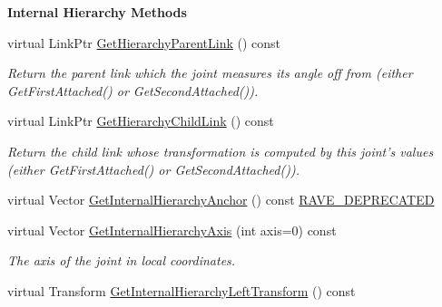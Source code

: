 \begin{Indent}{\bf Internal Hierarchy Methods}\par
{\em \label{_amgrp5fadc9ff450b069c20a2f9cda9fee3f7}
 }\begin{DoxyCompactItemize}
\item 
\hypertarget{classOpenRAVE_1_1KinBody_1_1Joint_ac77a611b4552ee4a91058884361e1eed}{
virtual LinkPtr \hyperlink{classOpenRAVE_1_1KinBody_1_1Joint_ac77a611b4552ee4a91058884361e1eed}{GetHierarchyParentLink} () const }
\label{classOpenRAVE_1_1KinBody_1_1Joint_ac77a611b4552ee4a91058884361e1eed}

\begin{DoxyCompactList}\small\item\em Return the parent link which the joint measures its angle off from (either GetFirstAttached() or GetSecondAttached()). \item\end{DoxyCompactList}\item 
\hypertarget{classOpenRAVE_1_1KinBody_1_1Joint_a99195cfe4f294630abece8e97727941b}{
virtual LinkPtr \hyperlink{classOpenRAVE_1_1KinBody_1_1Joint_a99195cfe4f294630abece8e97727941b}{GetHierarchyChildLink} () const }
\label{classOpenRAVE_1_1KinBody_1_1Joint_a99195cfe4f294630abece8e97727941b}

\begin{DoxyCompactList}\small\item\em Return the child link whose transformation is computed by this joint's values (either GetFirstAttached() or GetSecondAttached()). \item\end{DoxyCompactList}\item 
virtual Vector \hyperlink{classOpenRAVE_1_1KinBody_1_1Joint_a44ecb796397334c930f7e4dbb26a9f83}{GetInternalHierarchyAnchor} () const \hyperlink{namespaceOpenRAVE_af23fc4c2c72950a8c02f38ef71680bc6}{RAVE\_\-DEPRECATED}
\item 
\hypertarget{classOpenRAVE_1_1KinBody_1_1Joint_a2561b37d0b0c8d411d8beec026bb465e}{
virtual Vector \hyperlink{classOpenRAVE_1_1KinBody_1_1Joint_a2561b37d0b0c8d411d8beec026bb465e}{GetInternalHierarchyAxis} (int axis=0) const }
\label{classOpenRAVE_1_1KinBody_1_1Joint_a2561b37d0b0c8d411d8beec026bb465e}

\begin{DoxyCompactList}\small\item\em The axis of the joint in local coordinates. \item\end{DoxyCompactList}\item 
\hypertarget{classOpenRAVE_1_1KinBody_1_1Joint_a58faa57053a1da7655220459c93aa941}{
virtual Transform \hyperlink{classOpenRAVE_1_1KinBody_1_1Joint_a58faa57053a1da7655220459c93aa941}{GetInternalHierarchyLeftTransform} () const }
\label{classOpenRAVE_1_1KinBody_1_1Joint_a58faa57053a1da7655220459c93aa941}


\end{DoxyCompactItemize}
\end{Indent}
